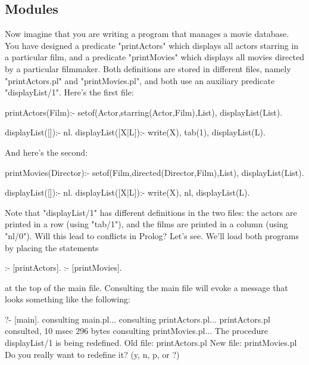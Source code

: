 \subsection*{Modules}\label{SUBSEC.L12.MODULES}

Now imagine that you are writing a program that manages a movie
database. You have designed a predicate "printActors" which displays
all actors starring in a particular film, and a predicate
"printMovies" which displays all movies directed by a particular
filmmaker. Both definitions are stored in different files, namely
"printActors.pl" and "printMovies.pl", and both use an auxiliary
predicate "displayList/1". Here's the first file:

\begin{LPNcodedisplay}

printActors(Film):-
   setof(Actor,starring(Actor,Film),List),
   displayList(List).

displayList([]):- nl.
displayList([X|L]):-
   write(X), tab(1),
   displayList(L).
\end{LPNcodedisplay}
And here's the second:
\begin{LPNcodedisplay}

printMovies(Director):-
   setof(Film,directed(Director,Film),List),
   displayList(List).

displayList([]):- nl.
displayList([X|L]):-
   write(X), nl,
   displayList(L).
\end{LPNcodedisplay}

Note that "displayList/1" has different definitions in the two files:
the actors are printed in a row (using "tab/1"), and the films are printed in a column (using
"nl/0").
Will this lead to conflicts in Prolog? Let's see. We'll
load both programs by placing the statements

\begin{LPNcodedisplay}

:- [printActors].
:- [printMovies].
\end{LPNcodedisplay}
at the top of the main file. Consulting the main file will
evoke a message that  looks something like the
following:

\begin{LPNcodedisplay}
?- [main].
{consulting main.pl...}
{consulting printActors.pl...}
{printActors.pl consulted, 10 msec 296 bytes}
{consulting printMovies.pl...}
The procedure displayList/1 is being redefined.
    Old file: printActors.pl
    New file: printMovies.pl
Do you really want to redefine it? (y, n, p, or ?)
\end{LPNcodedisplay}

